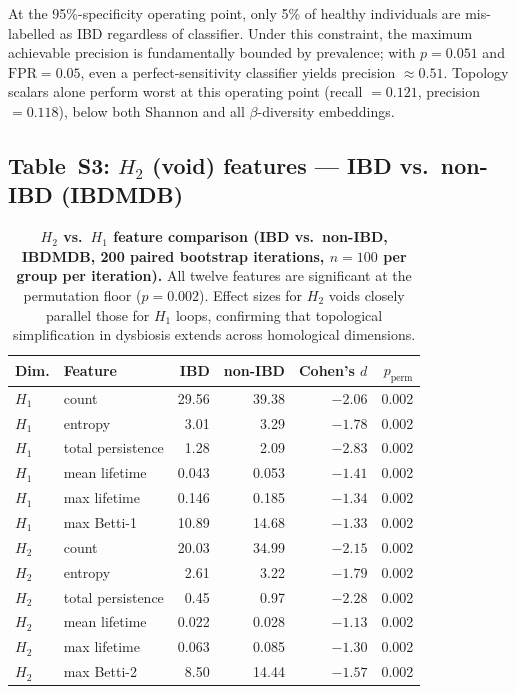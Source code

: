 At the 95\%-specificity operating point, only 5\% of healthy individuals are
mis-labelled as IBD regardless of classifier.
Under this constraint, the maximum achievable precision is fundamentally
bounded by prevalence; with $p = 0.051$ and $\text{FPR} = 0.05$,
even a perfect-sensitivity classifier yields precision $\approx 0.51$.
Topology scalars alone perform worst at this operating point
(recall $= 0.121$, precision $= 0.118$), below both Shannon and all
$\beta$-diversity embeddings.

\subsection*{Table~S3: $H_2$ (void) features --- IBD vs.\ non-IBD (IBDMDB)}

\begin{table}[H]
\centering
\caption{%
  \textbf{$H_2$ vs.\ $H_1$ feature comparison (IBD vs.\ non-IBD, IBDMDB,
  200 paired bootstrap iterations, $n = 100$ per group per iteration).}
  All twelve features are significant at the permutation floor
  ($p = 0.002$).  Effect sizes for $H_2$ voids closely parallel those
  for $H_1$ loops, confirming that topological simplification in
  dysbiosis extends across homological dimensions.
}
\label{tab:h2_features}
\small
\setlength{\tabcolsep}{5pt}
\begin{tabular}{llrrrr}
\toprule
\textbf{Dim.} & \textbf{Feature} & \textbf{IBD} & \textbf{non-IBD} & \textbf{Cohen's $d$} & \textbf{$p_\text{perm}$} \\
\midrule
$H_1$ & count             & 29.56 & 39.38 & $-2.06$ & 0.002 \\
$H_1$ & entropy           &  3.01 &  3.29 & $-1.78$ & 0.002 \\
$H_1$ & total persistence &  1.28 &  2.09 & $-2.83$ & 0.002 \\
$H_1$ & mean lifetime     &  0.043 & 0.053 & $-1.41$ & 0.002 \\
$H_1$ & max lifetime      &  0.146 & 0.185 & $-1.34$ & 0.002 \\
$H_1$ & max Betti-1       & 10.89 & 14.68 & $-1.33$ & 0.002 \\
\midrule
$H_2$ & count             & 20.03 & 34.99 & $-2.15$ & 0.002 \\
$H_2$ & entropy           &  2.61 &  3.22 & $-1.79$ & 0.002 \\
$H_2$ & total persistence &  0.45 &  0.97 & $-2.28$ & 0.002 \\
$H_2$ & mean lifetime     &  0.022 & 0.028 & $-1.13$ & 0.002 \\
$H_2$ & max lifetime      &  0.063 & 0.085 & $-1.30$ & 0.002 \\
$H_2$ & max Betti-2       &  8.50 & 14.44 & $-1.57$ & 0.002 \\
\bottomrule
\end{tabular}
\end{table}

